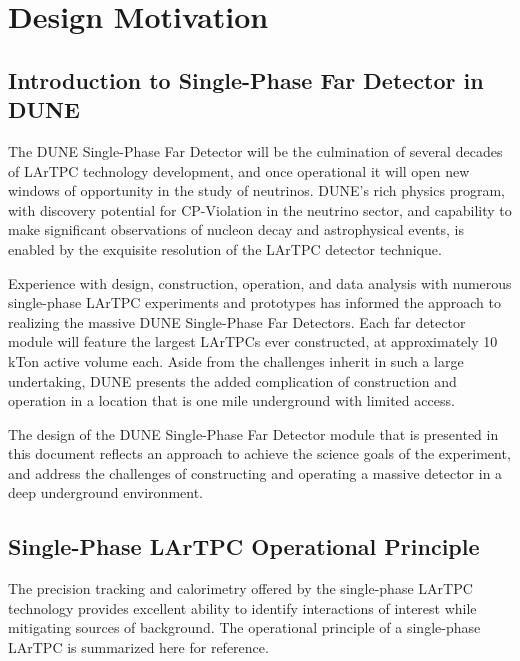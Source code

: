 \chapter{Design Motivation}
\label{ch:fdsp-apa-design}

\section{Introduction to Single-Phase Far Detector in DUNE}
\label{sec:fdsp-design-intro}

The DUNE Single-Phase Far Detector will be the culmination of several decades
of LArTPC technology development, and once operational it will open new windows of opportunity in the study
of neutrinos.  DUNE's rich physics program, with discovery
potential for CP-Violation in the neutrino sector, and capability to make
significant observations of nucleon decay and astrophysical events, is enabled
by the exquisite resolution of the LArTPC detector technique.

Experience with design, construction, operation, and data
analysis with numerous single-phase LArTPC experiments and prototypes has informed the approach to
realizing the massive DUNE Single-Phase Far Detectors. Each far detector module will feature the largest LArTPCs ever
constructed, at approximately 10 kTon active volume each.  Aside from the
challenges inherit in such a large undertaking, DUNE presents the added complication of construction and operation in a location
that is one mile underground with limited access.

The design of the DUNE Single-Phase Far Detector module that is presented in this document
reflects an approach to achieve the science goals of the experiment, and
address the challenges of constructing and operating a massive detector in a deep
underground environment.


\section{Single-Phase LArTPC Operational Principle}
\label{sec:fdsp-design-op}

The precision tracking and calorimetry offered by the single-phase LArTPC
technology provides excellent ability to identify interactions of interest
while mitigating sources of background.  The operational principle of a
single-phase LArTPC is summarized here for reference.


